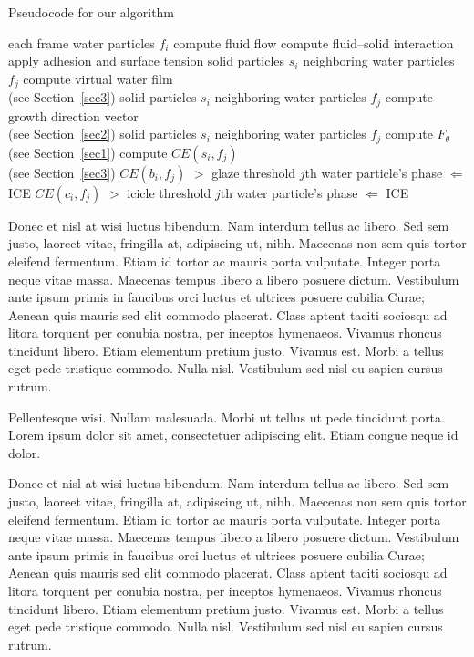 \documentclass[AMA,STIX1COL]{WileyNJD-SP}
\begin{document}
\begin{algorithm}
\caption{Pseudocode for our algorithm}\label{alg1}
\begin{algorithmic}
  \For each frame
  \For water particles $f_{i}$
  \State compute fluid flow\cite{Hirt1974}
  \State compute fluid--solid interaction\cite{Benson1992}
  \State apply adhesion and surface tension\cite{Margolin2003}
  \EndFor
   \For solid particles $s_{i}$
   \For neighboring water particles $f_{j}$
   \State compute virtual water film \\(see Section~\ref{sec3})
   \EndFor
   \EndFor
   \For solid particles $s_{i}$
   \For neighboring water particles $f_{j}$
   \State compute growth direction vector \\(see Section~\ref{sec2})
   \EndFor
   \EndFor
   \For solid particles $s_{i}$
   \For neighboring water particles $f_{j}$
   \State compute $F_{\theta}$ (see Section~\ref{sec1})
   \State compute $CE(s_{i},f_{j})$ \\(see Section~\ref{sec3})
   \If $CE(b_{i}, f_{j})$ $>$ glaze threshold
   \State $j$th water particle's phase $\Leftarrow$ ICE
   \EndIf
   \If $CE(c_{i}, f_{j})$ $>$ icicle threshold
   \State $j$th water particle's phase $\Leftarrow$ ICE
   \EndIf
   \EndFor
   \EndFor
  \EndFor
\end{algorithmic}
\end{algorithm}

Donec et nisl at wisi luctus bibendum. Nam interdum tellus ac libero. Sed sem justo, laoreet vitae, fringilla at,
adipiscing ut, nibh. Maecenas non sem quis tortor eleifend fermentum. Etiam id tortor ac mauris porta vulputate.
Integer porta neque vitae massa.\cite{Hirt1974,Benson1992}  Maecenas tempus libero a libero posuere dictum. Vestibulum ante ipsum primis in
faucibus orci luctus et ultrices posuere cubilia Curae; Aenean quis mauris sed elit commodo placerat. Class aptent
taciti sociosqu ad litora torquent per conubia nostra, per inceptos hymenaeos. Vivamus rhoncus tincidunt libero.
Etiam elementum pretium justo. Vivamus est. Morbi a tellus eget pede tristique commodo.\cite{Benson1992} Nulla nisl. Vestibulum
sed nisl eu sapien cursus rutrum.

Pellentesque wisi. Nullam malesuada. Morbi ut tellus ut pede tincidunt porta. Lorem ipsum dolor sit amet,
consectetuer adipiscing elit. Etiam congue neque id dolor.

Donec et nisl at wisi luctus bibendum. Nam interdum tellus ac libero. Sed sem justo, laoreet vitae, fringilla at,
adipiscing ut, nibh. Maecenas non sem quis tortor eleifend fermentum. Etiam id tortor ac mauris porta vulputate.
Integer porta neque vitae massa. Maecenas tempus libero a libero posuere dictum. Vestibulum ante ipsum primis in
faucibus orci luctus et ultrices posuere cubilia Curae; Aenean quis mauris sed elit commodo placerat. Class aptent
taciti sociosqu ad litora torquent per conubia nostra, per inceptos hymenaeos. Vivamus rhoncus tincidunt libero.
Etiam elementum pretium justo. Vivamus est. Morbi a tellus eget pede tristique commodo. Nulla nisl. Vestibulum
sed nisl eu sapien cursus rutrum.
\end{document}
